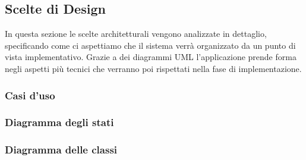 \subsection{Scelte di Design} \label{sec:design-choices}
In questa sezione le scelte architetturali vengono analizzate in dettaglio, 
specificando come ci aspettiamo che il sistema verrà organizzato da un punto di vista
implementativo. Grazie a dei diagrammi UML l'applicazione prende forma negli aspetti più
tecnici che verranno poi rispettati nella fase di implementazione.

\subsubsection{Casi d'uso} \label{sec:design-choices:use-cases}

\subsubsection{Diagramma degli stati} \label{sec:design-choices:state-diagram}

\subsubsection{Diagramma delle classi} \label{sec:design-choices:class-diagram}
